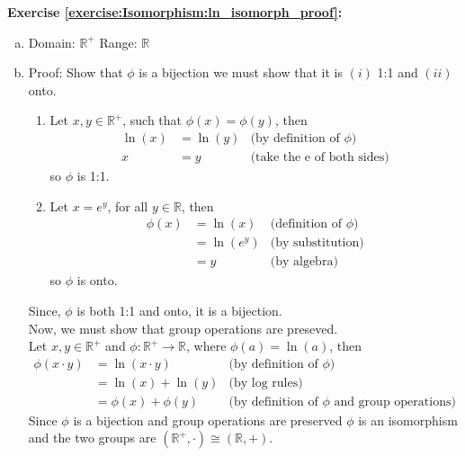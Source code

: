 \noindent\textbf{Exercise \ref{exercise:Isomorphism:ln_isomorph_proof}:}
\begin{enumerate}[(a)]
\item
Domain: ${\mathbb R}^+$  Range: ${\mathbb R}$

\item
Proof: Show that $\phi$ is a bijection we must show that it is $(i)$ 1:1 and $(ii)$ onto.
	\begin{enumerate}[($i$)]
	\item
	Let $x, y \in {\mathbb R}^+$, such that $\phi(x) = \phi(y)$, then
	\begin{align*}
	\ln(x) &= \ln(y) &\text{(by definition of\ } \phi)
	\\
	x &= y &\text{(take the e of both sides)}
	\end{align*}
	so $\phi$ is 1:1.

	\item
	Let $x = e^y$, for all $y \in {\mathbb R}$, then
	\begin{align*}
	\phi(x) &= \ln(x) &\text{(definition of\ } \phi)
	\\
	&= \ln(e^y) &\text{(by substitution)}
	\\
	&= y &\text{(by algebra)}
	\end{align*}
	so $\phi$ is onto.
	\end{enumerate}

	Since, $\phi$ is both 1:1 and onto, it is a bijection. 
	\\
	Now, we must show that group operations are preseved.
	\\
	Let $x, y \in {\mathbb R}^+$ and $\phi: {\mathbb R}^+ \rightarrow {\mathbb R}$, where $\phi(a) = \ln(a)$, then
	\\
	\begin{align*}
	\phi(x \cdot y) &= \ln(x \cdot y) &\text{(by definition of\ } \phi)
	\\
	&= \ln(x) + \ln(y) &\text{(by log rules)}
	\\
	&= \phi(x) + \phi(y) &\text{(by definition of\ } \phi \text{\ and group operations)}
	\end{align*}
	Since $\phi$ is a bijection and group operations are preserved $\phi$ is an isomorphism and the two groups are $({\mathbb R}^+, \cdot) \cong ({\mathbb R}, +)$.
	
\end{enumerate}

